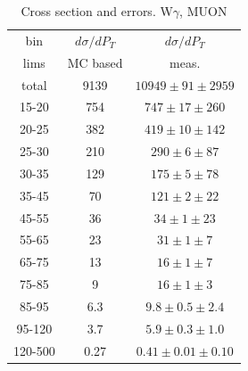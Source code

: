 \begin{table}[h]
  \scriptsize
  \begin{center}
  \caption{Cross section and errors. W$\gamma$, MUON}
  \begin{tabular}{|c|c|c|}
    bin & $d\sigma/dP_{T}$ &$d\sigma/dP_{T}$ \\ 
    lims & MC based &    meas.       \\ \hline
    total & 9139 & $10949 \pm 91 \pm 2959$ \\ \hline
    15-20 & 754 & $747 \pm 17 \pm 260$ \\ \hline
    20-25 & 382 & $419 \pm 10 \pm 142$ \\ \hline
    25-30 & 210 & $290 \pm 6 \pm 87$ \\ \hline
    30-35 & 129 & $175 \pm 5 \pm 78$ \\ \hline
    35-45 & 70 & $121 \pm 2 \pm 22$ \\ \hline
    45-55 & 36 & $34 \pm 1 \pm 23$ \\ \hline
    55-65 & 23 & $31 \pm 1 \pm 7$ \\ \hline
    65-75 & 13 & $16 \pm 1 \pm 7$ \\ \hline
    75-85 & 9 & $16 \pm 1 \pm 3$ \\ \hline
    85-95 & 6.3 & $9.8 \pm 0.5 \pm 2.4$ \\ \hline
    95-120 & 3.7 & $5.9 \pm 0.3 \pm 1.0$ \\ \hline
    120-500 & 0.27 & $0.41 \pm 0.01 \pm 0.10$ \\ \hline
  \end{tabular}
  \label{tab:sc_mc_vs_meas_MUON_WGamma}
  \end{center}
\end{table}

